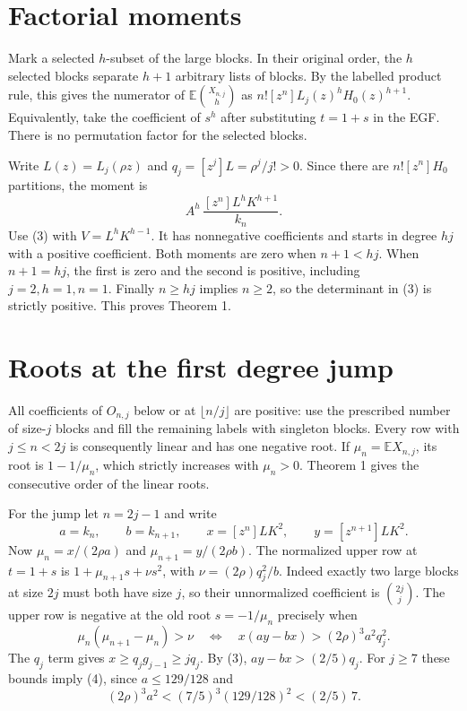 \documentclass[11pt]{article}
\begin{document}
\section{Factorial moments}

Mark a selected \(h\)-subset of the large blocks. In their original order, the \(h\) selected blocks separate \(h+1\) arbitrary lists of blocks. By the labelled product rule, this gives the numerator of \(\mathbb E\binom{X_{n,j}}h\) as \(n![z^n]L_j(z)^h H_0(z)^{h+1}\). Equivalently, take the coefficient of \(s^h\) after substituting \(t=1+s\) in the EGF. There is no permutation factor for the selected blocks.

Write \(L(z)=L_j(\rho z)\) and \(q_j=[z^j]L=\rho^j/j!>0\). Since there are \(n![z^n]H_0\) partitions, the moment is
\[
A^h\,\frac{[z^n]L^hK^{h+1}}{k_n}.
\]
Use (3) with \(V=L^hK^{h-1}\). It has nonnegative coefficients and starts in degree \(hj\) with a positive coefficient. Both moments are zero when \(n+1<hj\). When \(n+1=hj\), the first is zero and the second is positive, including \(j=2,h=1,n=1\). Finally \(n\ge hj\) implies \(n\ge2\), so the determinant in (3) is strictly positive. This proves Theorem 1.

\section{Roots at the first degree jump}

All coefficients of \(O_{n,j}\) below or at \(\lfloor n/j\rfloor\) are positive: use the prescribed number of size-\(j\) blocks and fill the remaining labels with singleton blocks. Every row with \(j\le n<2j\) is consequently linear and has one negative root. If \(\mu_n=\mathbb E X_{n,j}\), its root is \(1-1/\mu_n\), which strictly increases with \(\mu_n>0\). Theorem 1 gives the consecutive order of the linear roots.

For the jump let \(n=2j-1\) and write
\[
a=k_n,\qquad b=k_{n+1},\qquad
x=[z^n]LK^2,\qquad y=[z^{n+1}]LK^2.
\]
Now \(\mu_n=x/(2\rho a)\) and \(\mu_{n+1}=y/(2\rho b)\). The normalized upper row at \(t=1+s\) is \(1+\mu_{n+1}s+\nu s^2\), with \(\nu=(2\rho)q_j^2/b\). Indeed exactly two large blocks at size \(2j\) must both have size \(j\), so their unnormalized coefficient is \(\binom{2j}{j}\). The upper row is negative at the old root \(s=-1/\mu_n\) precisely when
\[
\mu_n(\mu_{n+1}-\mu_n)>\nu
\quad\Longleftrightarrow\quad
x(ay-bx)>(2\rho)^3a^2q_j^2.
\tag{4}
\]
The \(q_j\) term gives \(x\ge q_j g_{j-1}\ge jq_j\). By (3), \(ay-bx>(2/5)q_j\). For \(j\ge7\) these bounds imply (4), since \(a\le129/128\) and
\[
(2\rho)^3 a^2 < (7/5)^3(129/128)^2 < (2/5)\,7 .
\]
\end{document}
